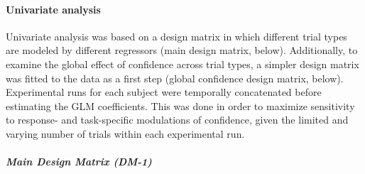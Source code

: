 \documentclass[12pt,twoside]{reedthesis}
\begin{document}
\hypertarget{univariate-analysis}{%
\paragraph*{Univariate analysis}\label{univariate-analysis}}

Univariate analysis was based on a design matrix in which different trial types are modeled by different regressors (main design matrix, below). Additionally, to examine the global effect of confidence across trial types, a simpler design matrix was fitted to the data as a first step (global confidence design matrix, below). Experimental runs for each subject were temporally concatenated before estimating the GLM coefficients. This was done in order to maximize sensitivity to response- and task-specific modulations of confidence, given the limited and varying number of trials within each experimental run.

\hypertarget{DM-1}{%
\subparagraph*{Main Design Matrix (DM-1)}\label{DM-1}}
\end{document}
